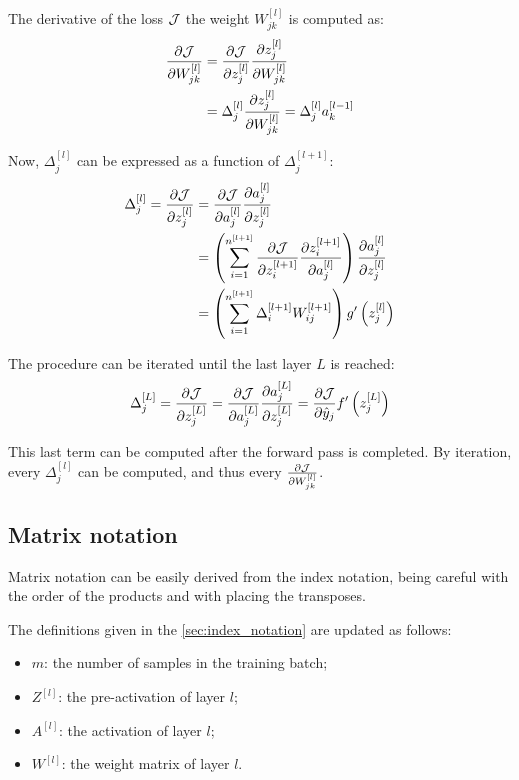 The derivative of the loss $\mathcal{J}$ \wrt the weight $W_{jk}^{[l]}$ is computed as:
\begin{align*}
    \pdv{\mathcal{J}}{W_{jk}^{[l]}} &= \pdv{\mathcal{J}}{z_j^{[l]}} \pdv{z_j^{[l]}}{W_{jk}^{[l]}}\\
    &= \Delta_j^{[l]} \pdv{z_j^{[l]}}{W_{jk}^{[l]}} = \Delta_j^{[l]} a_k^{[l-1]}
\end{align*}

Now, $\Delta_j^{[l]}$ can be expressed as a function of $\Delta_j^{[l + 1]}$:
\begin{align*}
    \Delta_j^{[l]} = \pdv{\mathcal{J}}{z_j^{[l]}} &= \pdv{\mathcal{J}}{a_j^{[l]}} \pdv{a_j^{[l]}}{z_j^{[l]}}\\
    &= \left( \sum_{i=1}^{n^{[l + 1]}} \pdv{\mathcal{J}}{z_i^{[l+1]}} \pdv{z_i^{[l+1]}}{a_j^{[l]}} \right) \pdv{a_j^{[l]}}{z_j^{[l]}}\\
    &= \left( \sum_{i=1}^{n^{[l + 1]}} \Delta_i^{[l+1]} W_{ij}^{[l+1]} \right) g'\left(z_j^{[l]}\right)
\end{align*}

The procedure can be iterated until the last layer $L$ is reached:
\begin{align*}
    \Delta_j^{[L]} = \pdv{\mathcal{J}}{z_j^{[L]}} = \pdv{\mathcal{J}}{a_j^{[L]}} \pdv{a_j^{[L]}}{z_j^{[L]}} = \pdv{\mathcal{J}}{\hat{y}_j} f'\left(z_j^{[L]}\right)
\end{align*}

This last term can be computed after the forward pass is completed. By iteration, every $\Delta_j^{[l]}$ can be computed, and thus every $\pdv{\mathcal{J}}{W_{jk}^{[l]}}$.

\subsection{Matrix notation} \label{sec:matrix_notation}
Matrix notation can be easily derived from the index notation, being careful with the order of the products and with placing the transposes.

The definitions given in the \cref{sec:index_notation} are updated as follows:
\begin{itemize}
    \item $m$: the number of samples in the training batch;
    \item $Z^{[l]}$: the  pre-activation of layer $l$;
    \item $A^{[l]}$: the  activation of layer $l$;
    \item $W^{[l]}$: the  weight matrix of layer $l$.
\end{itemize}

